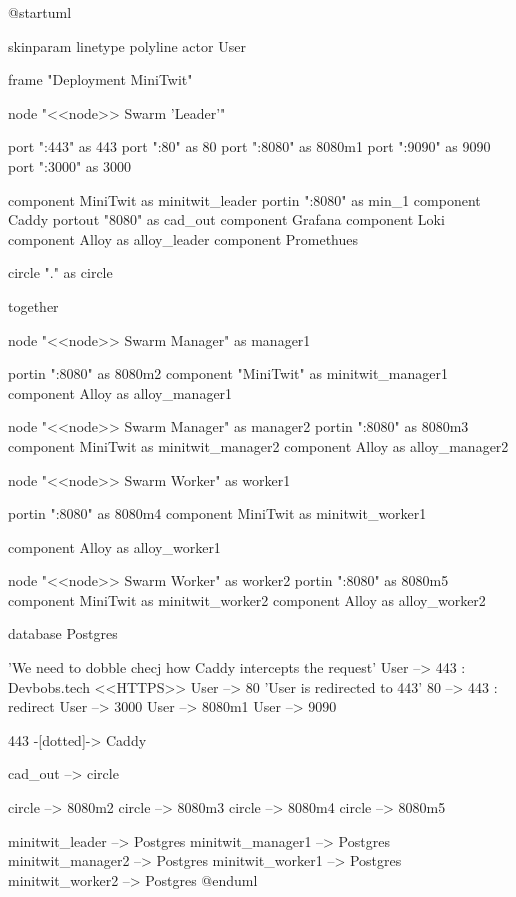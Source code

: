 \begin{plantuml}
@startuml 

skinparam linetype polyline
actor User

frame "Deployment MiniTwit" {
    

    node "<<node>> Swarm 'Leader'" {
        port ":443" as 443
        port ":80" as 80
        port ":8080" as 8080m1
        port ":9090" as 9090
        port ":3000" as 3000

        component MiniTwit as minitwit_leader{
            portin ":8080" as min_1
        }
        component Caddy {
            portout "8080" as cad_out
        }
        component Grafana
        component Loki
        component Alloy as alloy_leader
        component Promethues
    }

    circle "." as circle

    together {
        node "<<node>> Swarm Manager" as manager1 {
            portin ":8080" as 8080m2
            component "MiniTwit" as minitwit_manager1
            component Alloy as alloy_manager1
    
        }

        node "<<node>> Swarm Manager" as manager2 {
            portin ":8080" as 8080m3
            component MiniTwit as minitwit_manager2
            component Alloy as alloy_manager2
        }

        node "<<node>> Swarm Worker" as worker1 {
            portin ":8080" as 8080m4
            component MiniTwit as minitwit_worker1

            component Alloy as alloy_worker1
        }

        node "<<node>> Swarm Worker" as worker2 {
            portin ":8080" as 8080m5
            component MiniTwit as minitwit_worker2
            component Alloy as alloy_worker2
        }
    }
    

    database Postgres {
    }
}

'We need to dobble checj how Caddy intercepts the request'
User --> 443 : Devbobs.tech <<HTTPS>> 
User --> 80
'User is redirected to 443'
80 --> 443 : redirect
User --> 3000
User --> 8080m1
User --> 9090


443 -[dotted]-> Caddy

cad_out --> circle


circle --> 8080m2
circle --> 8080m3
circle --> 8080m4
circle --> 8080m5

minitwit_leader --> Postgres
minitwit_manager1 --> Postgres
minitwit_manager2 --> Postgres
minitwit_worker1 --> Postgres
minitwit_worker2 --> Postgres
@enduml
\end{plantuml}
